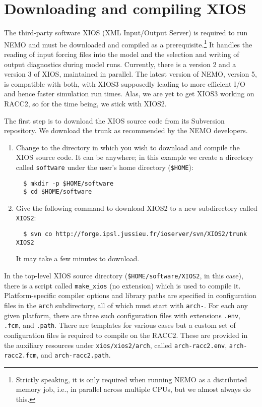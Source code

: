 \section{Downloading and compiling XIOS}
\label{sec:xios}

The third-party software XIOS (XML Input/Output Server) is required to run NEMO and must be downloaded and compiled as a prerequisite.\footnote{
    Strictly speaking, it is only required when running NEMO as a distributed memory job, i.e., in parallel across multiple CPUs, but we almost always do this.
}
It handles the reading of input forcing files into the model and the selection and writing of output diagnostics during model runs.
Currently, there is a version 2 and a version 3 of XIOS, maintained in parallel.
The latest version of NEMO, version 5, is compatible with both, with XIOS3 supposedly leading to more efficient I/O and hence faster simulation run times.
Alas, we are yet to get XIOS3 working on RACC2, so for the time being, we stick with XIOS2.

The first step is to download the XIOS source code from its Subversion repository.
We download the trunk as recommended by the NEMO developers.

\begin{enumerate}

    \item Change to the directory in which you wish to download and compile the XIOS source code.
        It can be anywhere; in this example we create a directory called \verb|software| under the user's home directory (\verb|$HOME|):

\begin{verbatim}
  $ mkdir -p $HOME/software
  $ cd $HOME/software
\end{verbatim}

    \item Give the following command to download XIOS2 to a new subdirectory called \verb|XIOS2|:

\begin{verbatim}
  $ svn co http://forge.ipsl.jussieu.fr/ioserver/svn/XIOS2/trunk XIOS2
\end{verbatim}

    It may take a few minutes to download.

\end{enumerate}

In the top-level XIOS source directory (\verb|$HOME/software/XIOS2|, in this case), there is a script called \verb|make_xios| (no extension) which is used to compile it.
Platform-specific compiler options and library paths are specified in configuration files in the \verb|arch| subdirectory, all of which must start with \verb|arch-|.
For each any given platform, there are three such configuration files with extensions \verb|.env|, \verb|.fcm|, and \verb|.path|.
There are templates for various cases but a custom set of configuration files is required to compile on the RACC2.
These are provided in the auxiliary resources under \verb|xios/xios2/arch|, called \verb|arch-racc2.env|, \verb|arch-racc2.fcm|, and \verb|arch-racc2.path|.

